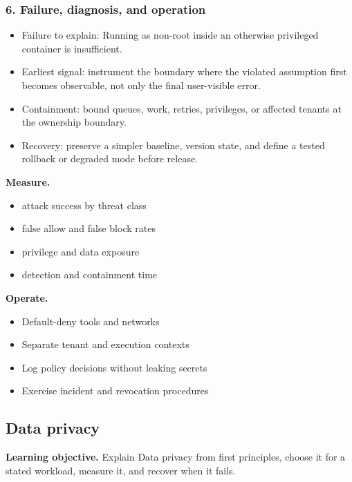 \subsubsection*{6. Failure, diagnosis, and operation}
\begin{itemize}
\item Failure to explain: Running as non-root inside an otherwise privileged container is insufficient.
\item Earliest signal: instrument the boundary where the violated assumption first becomes observable, not only the final user-visible error.
\item Containment: bound queues, work, retries, privileges, or affected tenants at the ownership boundary.
\item Recovery: preserve a simpler baseline, version state, and define a tested rollback or degraded mode before release.
\end{itemize}
\textbf{Measure.}\begin{itemize}
\item attack success by threat class
\item false allow and false block rates
\item privilege and data exposure
\item detection and containment time
\end{itemize}
\textbf{Operate.}\begin{itemize}
\item Default-deny tools and networks
\item Separate tenant and execution contexts
\item Log policy decisions without leaking secrets
\item Exercise incident and revocation procedures
\end{itemize}
\subsection{Data privacy}
\textbf{Learning objective.} Explain Data privacy from first principles, choose it for a stated workload, measure it, and recover when it fails.
